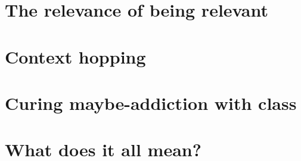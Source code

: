 \documentclass[runningheads]{llncs}
\newcommand\fslang{\ensuremath{\lambda_{\mathrm{FS}}}}
\newcommand\<\:                 %
\begin{document}
\section{The relevance of being relevant}

\section{Context hopping}



\section{Curing maybe-addiction with class}


\section{What does it all mean?}
\end{document}
